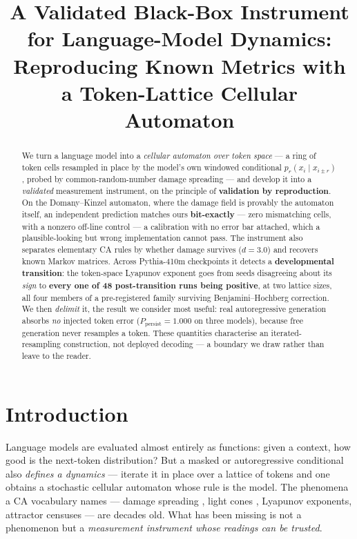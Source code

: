 \documentclass{article}
\title{A Validated Black-Box Instrument for Language-Model Dynamics:\\
Reproducing Known Metrics with a Token-Lattice Cellular Automaton}
\begin{document}
\maketitle

\begin{abstract}
We turn a language model into a \emph{cellular automaton over token space} --- a ring of token
cells resampled in place by the model's own windowed conditional $p_r(x_i\mid x_{i\pm r})$, probed
by common-random-number damage spreading --- and develop it into a \emph{validated} measurement
instrument, on the principle of \textbf{validation by reproduction}. On the Domany--Kinzel
automaton, where the damage field is provably the automaton itself, an independent prediction
matches ours \textbf{bit-exactly} --- zero mismatching cells, with a nonzero off-line control ---
a calibration with no error bar attached, which a plausible-looking but wrong implementation
cannot pass. The instrument also separates
elementary CA rules by whether damage survives ($d{=}3.0$) and recovers known Markov matrices.
Across Pythia-410m checkpoints it detects a \textbf{developmental transition}: the token-space
Lyapunov exponent goes from seeds disagreeing about its \emph{sign} to \textbf{every one of 48
post-transition runs being positive}, at two lattice sizes, all four members of a pre-registered
family surviving Benjamini--Hochberg correction. We then \emph{delimit} it, the result we consider
most useful: real autoregressive generation absorbs \emph{no} injected token error
($P_{\text{persist}}{=}1.000$ on three models), because free generation never resamples a token.
These quantities characterise an iterated-resampling construction, not deployed decoding --- a
boundary we draw rather than leave to the reader.
\end{abstract}

\section{Introduction}
Language models are evaluated almost entirely as functions: given a context, how good is the
next-token distribution? But a masked or autoregressive conditional also \emph{defines a dynamics}
--- iterate it in place over a lattice of tokens and one obtains a stochastic cellular automaton
whose rule is the model. The phenomena a CA vocabulary names --- damage spreading
\citep{bagnoli1992damage}, light cones \citep{lieb1972finite}, Lyapunov exponents, attractor
censuses \citep{hanson1997computational} --- are decades old. What has been missing is not a
phenomenon but a \emph{measurement instrument whose readings can be trusted}.
\end{document}

